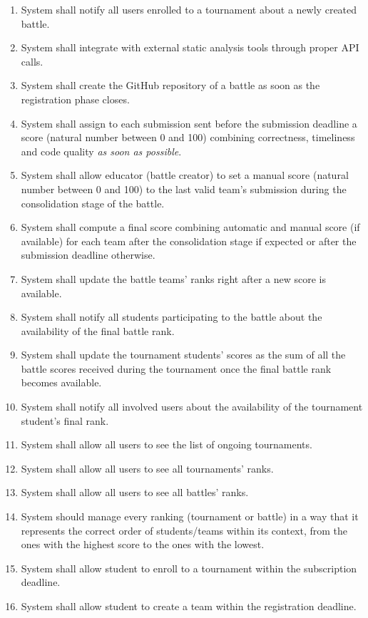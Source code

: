 \begin{enumerate}[label=$\bullet$ \textbf{R\arabic*:}]
    \item System shall notify all users enrolled to a tournament about a newly created battle.
    \item System shall integrate with external static analysis tools through proper API calls.
    \item System shall create the GitHub repository of a battle as soon as the registration phase closes.
    \item System shall assign to each submission sent before the submission deadline a score (natural number between 0 and 100) combining correctness, timeliness and code quality \textit{as soon as possible}.
    \item System shall allow educator (battle creator) to set a manual score (natural number between 0 and 100) to the last valid team’s submission during the consolidation stage of the battle.
    \item System shall compute a final score combining automatic and manual score (if available) for each team after the consolidation stage if expected or after the submission deadline otherwise.
    \item System shall update the battle teams’ ranks right after a new score is available.
    \item System shall notify all students participating to the battle about the availability of the final battle rank.
    \item System shall update the tournament students’ scores as the sum of all the battle scores received during the tournament once the final battle rank becomes available.
    \item System shall notify all involved users about the availability of the tournament student’s final rank.
    \item System shall allow all users to see the list of ongoing tournaments.
    \item System shall allow all users to see all tournaments’ ranks.
    \item System shall allow all users to see all battles' ranks.
    \item System should manage every ranking (tournament or battle) in a way that it represents the correct order of students/teams within its context, from the ones with the highest score to the ones with the lowest.
    \item System shall allow student to enroll to a tournament within the subscription deadline.
    \item System shall allow student to create a team within the registration deadline.

\end{enumerate}
